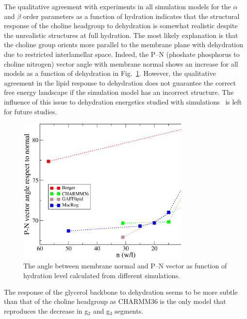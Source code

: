\documentclass[pre,aps,floatfix,authordate1-4,twocolumn]{revtex4-1}
\begin{document}
The qualitative agreement with experiments in all simulation models for the $\alpha$ and $\beta$ order parameters  
as a function of hydration indicates that the structural response of the choline headgroup to dehydration is somewhat realistic
despite the unrealistic structures at full hydration. 
The most likely explanation is that the choline group
orients more parallel to the membrane plane with dehydration due to restricted interlamellar space. 
Indeed, the P--N (phoshate phosphorus to choline nitrogen) vector angle with membrane normal shows an increase for
all models as a function of dehydration in Fig.~\ref{PNangle}.
However, the qualitative agreement in the lipid response to dehydration does not guarantee the correct 
free energy landscape if the simulation model has an incorrect structure. The influence of this issue to 
dehydration energetics studied with simulations~\cite{eun09,schneck12} is left for future studies.
\begin{figure}[]
  \centering
  \includegraphics[width=8.6cm]{PNangles.eps}

  \caption{\label{PNangle}
    The angle between membrane normal and P--N vector as function of
    hydration level calculated from different simulations.
  }
\end{figure}

The response of the glycerol backbone to dehydration seems to be more subtle than that of the choline headgroup 
as CHARMM36 is the only model that reproduces the decrease in g$_2$ and g$_3$ segments.
\end{document}
